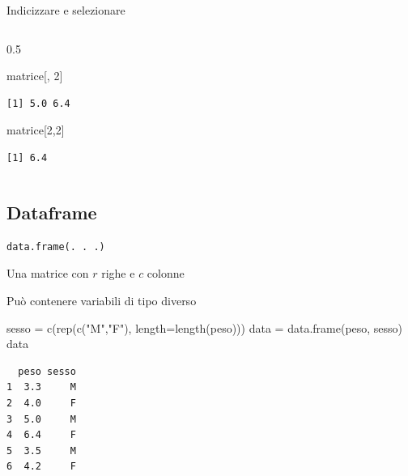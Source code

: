 \documentclass[
  ignorenonframetext,
  compress, aspectratio=149]{beamer}
\newenvironment{Shaded}{}{}
\newcommand{\AttributeTok}[1]{\textcolor[rgb]{0.00,0.34,0.68}{#1}}
\newcommand{\DecValTok}[1]{\textcolor[rgb]{0.69,0.50,0.00}{#1}}
\newcommand{\FunctionTok}[1]{\textcolor[rgb]{0.39,0.29,0.61}{#1}}
\newcommand{\NormalTok}[1]{\textcolor[rgb]{0.12,0.11,0.11}{#1}}
\newcommand{\OtherTok}[1]{\textcolor[rgb]{0.00,0.43,0.16}{#1}}
\newcommand{\StringTok}[1]{\textcolor[rgb]{0.75,0.01,0.01}{#1}}
\begin{document}
\begin{frame}[fragile]{Indicizzare e selezionare}
\begin{columns}[T]
\begin{column}{0.5\linewidth}
\begin{Shaded}
\begin{Highlighting}[]
\NormalTok{matrice[, }\DecValTok{2}\NormalTok{]}
\end{Highlighting}
\end{Shaded}

\begin{verbatim}
[1] 5.0 6.4
\end{verbatim}

\begin{Shaded}
\begin{Highlighting}[]
\NormalTok{matrice[}\DecValTok{2}\NormalTok{,}\DecValTok{2}\NormalTok{]}
\end{Highlighting}
\end{Shaded}

\begin{verbatim}
[1] 6.4
\end{verbatim}
\end{column}
\end{columns}
\end{frame}

\subsection{Dataframe}\label{dataframe}

\begin{frame}[fragile]{}
\label{section-11}
\begin{verbatim}
data.frame(. . .)
\end{verbatim}

Una matrice con \(r\) righe e \(c\) colonne

Può contenere variabili di tipo diverso

\small

\begin{Shaded}
\begin{Highlighting}[]
\NormalTok{sesso }\OtherTok{=} \FunctionTok{c}\NormalTok{(}\FunctionTok{rep}\NormalTok{(}\FunctionTok{c}\NormalTok{(}\StringTok{"M"}\NormalTok{,}\StringTok{"F"}\NormalTok{), }\AttributeTok{length=}\FunctionTok{length}\NormalTok{(peso)))}
\NormalTok{data }\OtherTok{=} \FunctionTok{data.frame}\NormalTok{(peso, sesso)}
\NormalTok{data}
\end{Highlighting}
\end{Shaded}

\begin{verbatim}
  peso sesso
1  3.3     M
2  4.0     F
3  5.0     M
4  6.4     F
5  3.5     M
6  4.2     F
\end{verbatim}
\end{frame}
\end{document}

